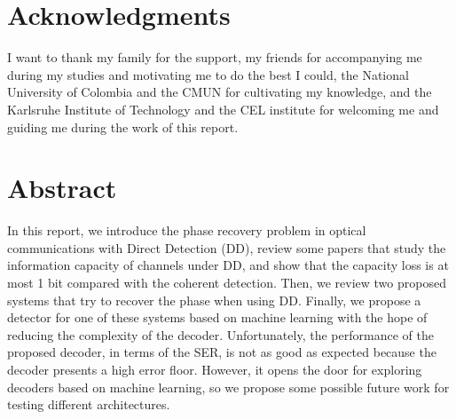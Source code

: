 \chapter*{Acknowledgments}

I want to thank my family for the support, my friends for accompanying me during my studies and motivating me to do the best I could, the National University of Colombia and the CMUN for cultivating my knowledge, and the Karlsruhe Institute of Technology and the CEL institute for welcoming me and guiding me during the work of this report.




\chapter*{Abstract}



In this report, we introduce the phase recovery problem in optical communications with Direct Detection (DD), review some papers that study the information capacity of channels under DD, and show that the capacity loss is at most 1 bit compared with the coherent detection. Then, we review two proposed systems that try to recover the phase when using DD. Finally, we propose a detector for one of these systems based on machine learning with the hope of reducing the complexity of the decoder. Unfortunately, the performance of the proposed decoder, in terms of the SER, is not as good as expected because the decoder presents a high error floor. However, it opens the door for exploring decoders based on machine learning, so we propose some possible future work for testing different architectures.